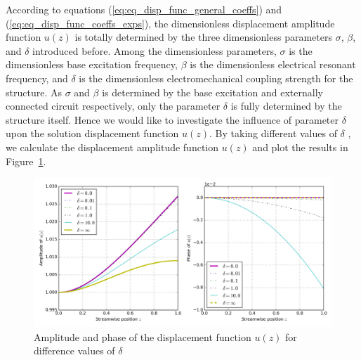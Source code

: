 \documentclass{article}
\begin{document}
According to equations (\ref{eq:eq_disp_func_general_coeffs}) and (\ref{eq:eq_disp_func_coeffs_exps}), the dimensionless displacement amplitude function $u(z)$ is totally determined by the three dimensionless parameters $\sigma$, $\beta$, and $\delta$ introduced before. Among the dimensionless parameters, $\sigma$ is the dimensionless base excitation frequency, $\beta$ is the dimensionless electrical resonant frequency, and $\delta$ is the dimensionless electromechanical coupling strength for the structure. As $\sigma$ and $\beta$ is determined by the base excitation and externally connected circuit respectively, only the parameter $\delta$ is fully determined by the structure itself. Hence we would like to investigate the influence of parameter $\delta$ upon the solution displacement function $u(z)$. By taking different values of $\delta$ , we calculate the displacement amplitude function $u(z)$ and plot the results in Figure~\ref{fig:fig_sol_analytic_disp_fun}.


\begin{figure}[!htbp]
    \centering
    \includegraphics[width=\textwidth]{./img_eig_asy/fig_sol_analytic_disp_fun.jpg}
    \caption{Amplitude and phase of the displacement function $u(z)$ for difference values of $\delta$ }
    \label{fig:fig_sol_analytic_disp_fun}
\end{figure}
\end{document}
